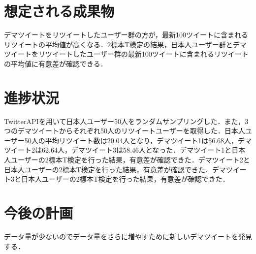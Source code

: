 \documentclass[uplatex,twocolumn,dvipdfmx]{jsarticle}
\begin{document}
\section{想定される成果物}
デマツイートをリツイートしたユーザー群の方が，最新100ツイートに含まれるリツイートの平均値が高くなる．2標本T検定の結果，日本人ユーザー群とデマツイートをリツイートしたユーザー群の最新100ツイートに含まれるリツイートの平均値に有意差が確認できる．

\section{進捗状況}
TwitterAPIを用いて日本人ユーザー50人をランダムサンプリングした．また，3つのデマツイートからそれぞれ50人のリツイートユーザーを取得した．日本人ユーザー50人の平均リツイート数は20.04人となり，デマツイート1は56.68人，デマツイート2は62.64人，デマツイート3は58.46人となった．デマツイート1と日本人ユーザーの2標本T検定を行った結果，有意差が確認できた．デマツイート2と日本人ユーザーの2標本T検定を行った結果，有意差が確認できた．デマツイート3と日本人ユーザーの2標本T検定を行った結果，有意差が確認できた．

\section{今後の計画}
データ量が少ないのでデータ量をさらに増やすために新しいデマツイートを発見する．


\end{document}
